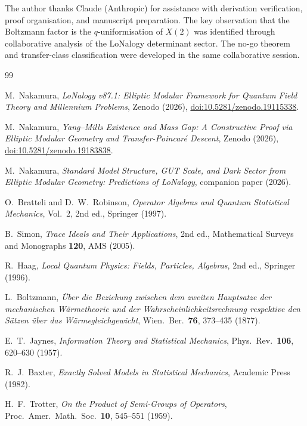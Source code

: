\documentclass[12pt]{article}
\theoremstyle{plain}
\theoremstyle{definition}
\numberwithin{equation}{section}
\begin{document}
The author thanks Claude (Anthropic) for assistance with derivation
verification, proof organisation, and manuscript preparation.
The key observation that the Boltzmann factor is the $q$-uniformisation
of $X(2)$ was identified through collaborative analysis of the LoNalogy
determinant sector.  The no-go theorem and transfer-class classification
were developed in the same collaborative session.


\begin{thebibliography}{99}

M.~Nakamura,
\textit{LoNalogy v87.1: Elliptic Modular Framework for Quantum Field Theory
and Millennium Problems},
Zenodo (2026), \href{https://doi.org/10.5281/zenodo.19115338}{doi:10.5281/zenodo.19115338}.

M.~Nakamura,
\textit{Yang--Mills Existence and Mass Gap: A Constructive Proof via
Elliptic Modular Geometry and Transfer-Poincar\'e Descent},
Zenodo (2026), \href{https://doi.org/10.5281/zenodo.19183838}{doi:10.5281/zenodo.19183838}.

M.~Nakamura,
\textit{Standard Model Structure, GUT Scale, and Dark Sector from Elliptic
Modular Geometry: Predictions of LoNalogy},
companion paper (2026).

O.~Bratteli and D.~W.~Robinson,
\textit{Operator Algebras and Quantum Statistical Mechanics},
Vol.~2, 2nd ed., Springer (1997).

B.~Simon,
\textit{Trace Ideals and Their Applications},
2nd ed., Mathematical Surveys and Monographs \textbf{120},
AMS (2005).

R.~Haag,
\textit{Local Quantum Physics: Fields, Particles, Algebras},
2nd ed., Springer (1996).

L.~Boltzmann,
\textit{\"Uber die Beziehung zwischen dem zweiten Hauptsatze der
mechanischen W\"armetheorie und der Wahrscheinlichkeitsrechnung
respektive den S\"atzen \"uber das W\"armegleichgewicht},
Wien.\ Ber.\ \textbf{76}, 373--435 (1877).

E.~T.~Jaynes,
\textit{Information Theory and Statistical Mechanics},
Phys.\ Rev.\ \textbf{106}, 620--630 (1957).

R.~J.~Baxter,
\textit{Exactly Solved Models in Statistical Mechanics},
Academic Press (1982).

H.~F.~Trotter,
\textit{On the Product of Semi-Groups of Operators},
Proc.\ Amer.\ Math.\ Soc.\ \textbf{10}, 545--551 (1959).

\end{thebibliography}
\end{document}
